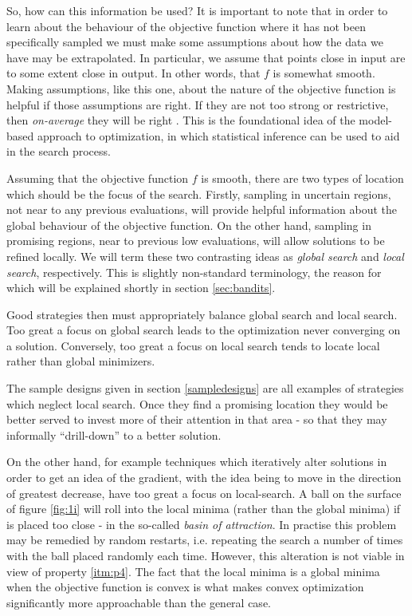 So, how can this information be used? It is important to note that in order to learn about the behaviour of the objective function where it has not been specifically sampled we must make some assumptions about how the data we have may be extrapolated. In particular, we assume that points close in input are to some extent close in output. In other words, that $f$ is somewhat smooth. Making assumptions, like this one, about the nature of the objective function is helpful if those assumptions are right. If they are not too strong or restrictive, then \textit{on-average} they will be right \cite{blog}. This is the foundational idea of the model-based approach to optimization, in which statistical inference can be used to aid in the search process.

Assuming that the objective function $f$ is smooth, there are two types of location which should be the focus of the search. Firstly, sampling in uncertain regions, not near to any previous evaluations, will provide helpful information about the global behaviour of the objective function. On the other hand, sampling in promising regions, near to previous low evaluations, will allow solutions to be refined locally. We will term these two contrasting ideas as \textit{global search} and \textit{local search}, respectively. This is slightly non-standard terminology, the reason for which will be explained shortly in section \ref{sec:bandits}.

Good strategies then must appropriately balance global search and local search. Too great a focus on global search leads to the optimization never converging on a solution. Conversely, too great a focus on local search tends to locate local rather than global minimizers.

The sample designs given in section \ref{sampledesigns} are all examples of strategies which neglect local search. Once they find a promising location they would be better served to invest more of their attention in that area - so that they may informally ``drill-down'' \cite{lectures} to a better solution.

On the other hand, for example techniques which iteratively alter solutions in order to get an idea of the gradient, with the idea being to move in the direction of greatest decrease, have too great a focus on local-search. A ball on the surface of figure \ref{fig:1i} will roll into the local minima (rather than the global minima) if is placed too close - in the so-called \textit{basin of attraction}. In practise this problem may be remedied by random restarts, i.e. repeating the search a number of times with the ball placed randomly each time. However, this alteration is not viable in view of property \ref{itm:p4}. The fact that the local minima is a global minima when the objective function is convex is what makes convex optimization significantly more approachable than the general case.

